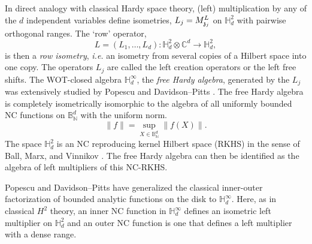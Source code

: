 \documentclass{article}
\theoremstyle{definition}
\theoremstyle{remark}
\numberwithin{equation}{section}
\newcommand{\mf}{\ensuremath{\mathfrak}}
\def\C{\mathbb{C}}
\def\N{\mathbb{N}}
\def\B{\mathbb{B}}
\def\bH{\mathbb{H}}
\def\hardy{\mathbb{H} ^2 _d}
\begin{document}
In direct analogy with classical Hardy space theory, (left) multiplication by any of the $d$ independent variables define isometries, $L_j = M^L _{\mf{z} _j}$ on $\hardy$ with pairwise orthogonal ranges. The `row' operator, $$L = (L_1,\ldots,L_d) \colon \bH^2_d \otimes \C^d \to \bH^2_d,$$ is then a \emph{row isometry}, \emph{i.e.} an isometry from several copies of a Hilbert space into one copy. The operators $L_j$ are called the left creation operators or the left free shifts. The WOT-closed algebra $\bH^{\infty}_d$, the \emph{free Hardy algebra}, generated by the $L_j$ was extensively studied by Popescu \cite{Pop-freeholo,Pop-freeholo2,Pop-vN} and Davidson--Pitts \cite{DP-inv,DP-alg,DP-NevPick}. The free Hardy algebra is completely isometrically isomorphic to the algebra of all uniformly bounded NC functions on $\B_{\N} ^d$ with the uniform norm.
\[
\|f\| = \sup_{X \in \B_{\N} ^d}\|f(X)\|.
\]
The space $\bH^2_d$ is an NC reproducing kernel Hilbert space (RKHS) in the sense of Ball, Marx, and Vinnikov \cite{BMV}. The free Hardy algebra can then be identified as the algebra of left multipliers of this NC-RKHS.

Popescu and Davidson--Pitts have generalized the classical inner-outer factorization of bounded analytic functions on the disk to $\bH^{\infty}_d$. Here, as in classical $H^2$ theory, an inner NC function in $\bH^{\infty}_d$ defines an isometric left multiplier on $\bH^2_d$ and an outer NC function is one that defines a left multiplier with a dense range.
\end{document}
